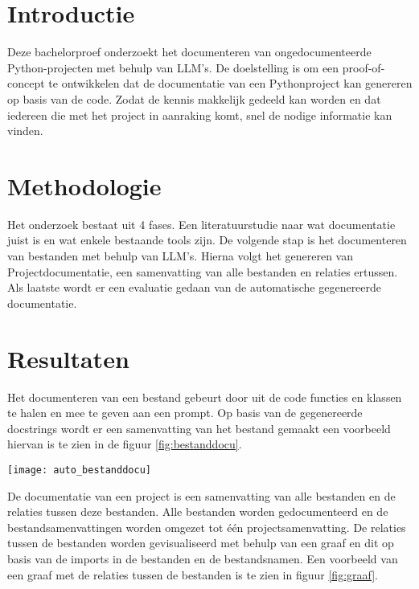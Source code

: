 \documentclass[a0,portrait]{hogent-poster}
\begin{document}
\begin{multicols}{2} %

\section{Introductie}
Deze bachelorproef onderzoekt het documenteren van ongedocumenteerde Python-projecten met behulp van LLM's. 
De doelstelling is om een proof-of-concept te ontwikkelen dat de documentatie van een Pythonproject kan genereren op basis van de code.
Zodat de kennis makkelijk gedeeld kan worden en dat iedereen die met het project in aanraking komt, snel de nodige informatie kan vinden.

\section{Methodologie}
Het onderzoek bestaat uit 4 fases. Een literatuurstudie naar wat documentatie juist is en wat enkele bestaande tools zijn.
De volgende stap is het documenteren van bestanden met behulp van LLM's. Hierna volgt het genereren van Projectdocumentatie, een samenvatting van alle bestanden en relaties ertussen.
Als laatste wordt er een evaluatie gedaan van de automatische gegenereerde documentatie.

\section{Resultaten}
Het documenteren van een bestand gebeurt door uit de code functies en klassen te halen en mee te geven aan een prompt.
Op basis van de gegenereerde docstrings wordt er een samenvatting van het bestand gemaakt een voorbeeld hiervan is te zien in de figuur \ref{fig:bestanddocu}.

\begin{center}
  \captionsetup{type=figure}
  \texttt{[image: auto\_bestanddocu]}
  \label{fig:bestanddocu}
\end{center}

De documentatie van een project is een samenvatting van alle bestanden en de relaties tussen deze bestanden.
Alle bestanden worden gedocumenteerd en de bestandsamenvattingen worden omgezet tot één projectsamenvatting.
De relaties tussen de bestanden worden gevisualiseerd met behulp van een graaf en dit op basis van de imports in de bestanden en de bestandsnamen.
Een voorbeeld van een graaf met de relaties tussen de bestanden is te zien in figuur \ref{fig:graaf}.


\end{multicols}
\end{document}
